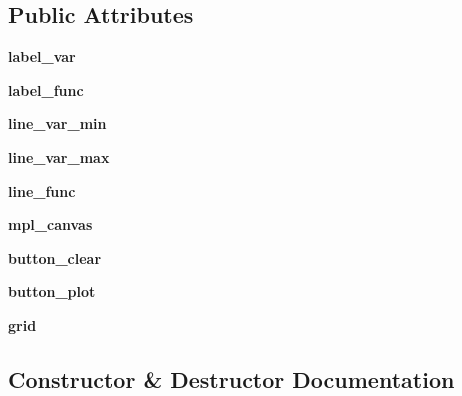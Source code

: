 \subsection*{Public Attributes}
\begin{DoxyCompactItemize}
\item 
\mbox{\label{classfunc__plot__app_1_1MPLWidget_a55bdfcf3b0e689cfef123fa57a7dc52f}} 
{\bfseries label\+\_\+var}
\item 
\mbox{\label{classfunc__plot__app_1_1MPLWidget_a8754cbc21690af08c1e547dfb85ac38e}} 
{\bfseries label\+\_\+func}
\item 
\mbox{\label{classfunc__plot__app_1_1MPLWidget_a36a5eeca82ca462f456b1b2c5c06bf66}} 
{\bfseries line\+\_\+var\+\_\+min}
\item 
\mbox{\label{classfunc__plot__app_1_1MPLWidget_a0cb2e931ba60562047bdfbded15a919d}} 
{\bfseries line\+\_\+var\+\_\+max}
\item 
\mbox{\label{classfunc__plot__app_1_1MPLWidget_ad5777cb4e9ce4f1ccfe349307e7ad7a8}} 
{\bfseries line\+\_\+func}
\item 
\mbox{\label{classfunc__plot__app_1_1MPLWidget_a0d9c0c17a95fcc664697ae75a74cdeaa}} 
{\bfseries mpl\+\_\+canvas}
\item 
\mbox{\label{classfunc__plot__app_1_1MPLWidget_a481646bfbf756f1a3db447ae63695670}} 
{\bfseries button\+\_\+clear}
\item 
\mbox{\label{classfunc__plot__app_1_1MPLWidget_aba15bc762f1dea1b5ffcd507bb631109}} 
{\bfseries button\+\_\+plot}
\item 
\mbox{\label{classfunc__plot__app_1_1MPLWidget_aaf046fdffef818053174c01985abc3e7}} 
{\bfseries grid}
\end{DoxyCompactItemize}


\subsection{Constructor \& Destructor Documentation}
\mbox{\label{classfunc__plot__app_1_1MPLWidget_a3071d56c34fba91275079ab6bbf0ba6e}} 
